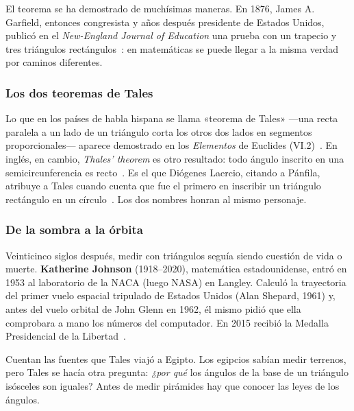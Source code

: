 \documentclass[11pt]{article}
\begin{document}
El teorema se ha demostrado de muchísimas maneras. En 1876, James A.
Garfield, entonces congresista y años después presidente de Estados Unidos,
publicó en el \emph{New-England Journal of Education} una prueba con un
trapecio y tres triángulos rectángulos~\cite{garfield, ellermeyer}: en
matemáticas se puede llegar a la misma verdad por caminos diferentes.

\subsubsection*{Los dos teoremas de Tales}

Lo que en los países de habla hispana se llama «teorema de Tales» —una
recta paralela a un lado de un triángulo corta los otros dos lados en
segmentos proporcionales— aparece demostrado en los \emph{Elementos} de
Euclides (VI.2)~\cite{euclidesVI2}. En inglés, en cambio, \emph{Thales'
theorem} es otro resultado: todo ángulo inscrito en una semicircunferencia
es recto~\cite{mathworld}. Es el que Diógenes Laercio, citando a Pánfila,
atribuye a Tales cuando cuenta que fue el primero en inscribir un triángulo
rectángulo en un círculo~\cite{diogenes}. Los dos nombres honran al mismo
personaje.

\subsubsection*{De la sombra a la órbita}

Veinticinco siglos después, medir con triángulos seguía siendo cuestión de
vida o muerte. \textbf{Katherine Johnson} (1918--2020), matemática
estadounidense, entró en 1953 al laboratorio de la NACA (luego NASA) en
Langley. Calculó la trayectoria del primer vuelo espacial tripulado de
Estados Unidos (Alan Shepard, 1961) y, antes del vuelo orbital de John
Glenn en 1962, él mismo pidió que ella comprobara a mano los números del
computador. En 2015 recibió la Medalla Presidencial de la
Libertad~\cite{nasajohnson}.

\label{tema:angulostriangulo}

\begin{hilo}
Cuentan las fuentes que Tales viajó a Egipto. Los egipcios sabían medir
terrenos, pero Tales se hacía otra pregunta: \emph{¿por qué} los ángulos de
la base de un triángulo isósceles son iguales? Antes de medir pirámides hay
que conocer las leyes de los ángulos.
\end{hilo}
\end{document}
